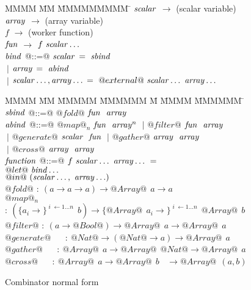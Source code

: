 \begin{figure}
\begin{tabbing}
MMMM        \= MM \= MMMMMMMMM \= \kill
$\mathit{scalar}$    \> $\to$ \> (scalar variable) \\
$\mathit{array}$     \> $\to$ \> (array variable)  \\
$f$         \> $\to$ \> (worker function) \\
$\mathit{fun}$       \> $\to$ \> $f~\mathit{scalar}\ldots$
\\[2ex]
$\mathit{bind}$      \> @::=@ \> $\mathit{scalar}$ \> $=~\mathit{sbind}$ \\
            \> $~|$  \> $\mathit{array}$  \> $=~\mathit{abind}$ \\
            \> $~|$  \> $\mathit{scalar}\ldots,\mathit{array}\ldots$ \> $=~@external@~\mathit{scalar}\ldots~\mathit{array}\ldots$
\end{tabbing}

\begin{tabbing}
MMMM        \= MM \= MMMMM \= MMMMMM \= M \= MMMM \= MMMMMM \= \kill
$\mathit{sbind}$     \> @::=@ \> $@fold@$     \> $\mathit{fun}~~ \mathit{array}$
\\[1ex]

$\mathit{abind}$     \> @::=@ \> $@map@_n$    \> $\mathit{fun}~~ \mathit{array}^n$ 
            \> $~|$  \> $@filter@$   \> $\mathit{fun}~~ \mathit{array}$   \\
            \> $~|$  \> $@generate@$ \> $\mathit{scalar}~~ \mathit{fun}$  
            \> $~|$  \> $@gather@$   \> $\mathit{array}~~ \mathit{array}$ \\
            \> $~|$  \> $@cross@$    \> $\mathit{array}~~ \mathit{array}$
\\[1ex]
$\mathit{function}$  \> @::=@ \> $f~\mathit{scalar}\ldots~\mathit{array}\ldots~=$ \\
            \>          \> $@let@~\mathit{bind}\ldots$                  \\
            \>          \> $@in@~(\mathit{scalar}\ldots,~\mathit{array}\ldots)$
\\[3ex]
$@fold@$     \> $:~ (a \to a \to a) \to @Array@~~ a \to a$     \\
$@map@_n$    \> $:~ (\{a_i          \to\}^{\;i\; \gets 1 \dots n}~~ b)  \to
                       \{@Array@~~ a_i \to\}^{\;i\; \gets 1 \dots n}~~ @Array@~~ b$ \\
$@filter@$   \> $:~ (a \to @Bool@) \to @Array@~~ a \to @Array@~~ a$      \\
$@generate@$ \> ~~ $:~ @Nat@ \to (@Nat@ \to a) \to @Array@~~ a$          \\
$@gather@$   \> ~~ $:~ @Array@~~ a \to @Array@~~ @Nat@  \to @Array@~~ a$ \\
$@cross@$    \> ~~ $:~ @Array@~~ a \to @Array@~~ b ~~~~ \to @Array@~~ (a, b)$
\end{tabbing}
\caption{Combinator normal form}
\label{f:CombinatorNormalForm}
\end{figure}

